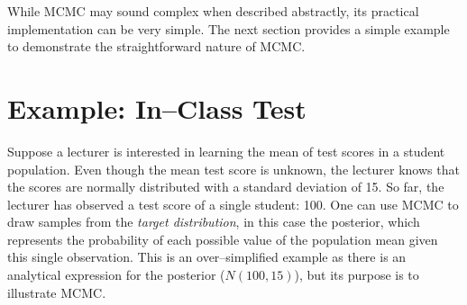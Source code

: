 While MCMC may sound complex when described abstractly, its practical implementation can be very simple. The next section provides a simple example to demonstrate the straightforward nature of MCMC.


\section{Example: In--Class Test}

Suppose a lecturer is interested in learning the mean of test scores in a student population. Even though the mean test score is unknown, the lecturer knows that the scores are normally distributed with a standard deviation of 15. So far, the lecturer has observed a test score of a single student: 100. One can use MCMC to draw samples from the \emph{target distribution}, in this case the posterior, which represents the probability of each possible value of the population mean given this single observation. This is an over--simplified example as there is an analytical expression for the posterior ($N(100,15)$), but its purpose is to illustrate MCMC.

